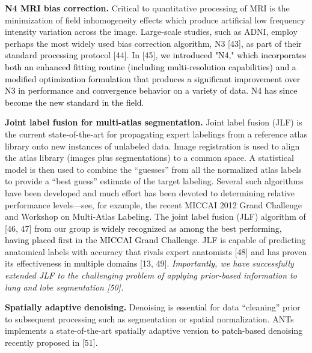\documentclass[11pt,]{article}
\begin{document}
\textbf{N4 \textcolor{black}{MRI} bias correction.} Critical to
quantitative processing of MRI is the minimization of field
inhomogeneity effects which produce artificial low frequency intensity
variation across the image. Large-scale studies, such as ADNI, employ
perhaps the most widely used bias correction algorithm, N3 {[}43{]}, as
part of their standard \textcolor{black}{processing} protocol {[}44{]}.
In {[}45{]},
\textcolor{black}{we introduced "N4," which incorporates both an enhanced fitting
routine (including multi-resolution capabilities) and a modified optimization
formulation that produces a significant improvement over N3 in performance and
convergence behavior on a variety of data.  N4 has since become the new standard in the
field.}

\textbf{Joint label fusion for \textcolor{black}{multi-atlas}
segmentation.} Joint label fusion (JLF) is the current state-of-the-art
for propagating expert labelings from a reference atlas library onto new
instances of unlabeled data. Image registration is used to align the
atlas library (images plus segmentations) to a common space. A
statistical model is then used to combine the ``guesses'' from all the
normalized atlas labels to provide a ``best guess'' estimate of the
target labeling. Several such algorithms have been developed and much
effort has been devoted to determining relative performance
levels---see, for example, the recent MICCAI 2012 Grand Challenge and
Workshop on Multi-Atlas Labeling. The joint label fusion (JLF) algorithm
of {[}46, 47{]} from our group is
\textcolor{black}{widely recognized as among the best performing, having placed
first in the MICCAI Grand Challenge}. JLF is capable of predicting
anatomical labels with accuracy that rivals expert anatomists {[}48{]}
and has proven its effectiveness \textcolor{black}{in multiple domains}
{[}13, 49{]}. \emph{\textcolor{black}{Importantly, we have} successfully
extended \textcolor{black}{JLF} to the challenging problem of applying
prior-based information to lung and lobe segmentation {[}50{]}.}

\textbf{Spatially adaptive denoising.} Denoising is
\textcolor{black}{essential} for data ``cleaning'' prior to subsequent
processing such as segmentation or spatial normalization. ANTs
implements a state-of-the-art spatially adaptive version to
\textcolor{black}{patch-based} denoising recently proposed in {[}51{]}.
\end{document}
